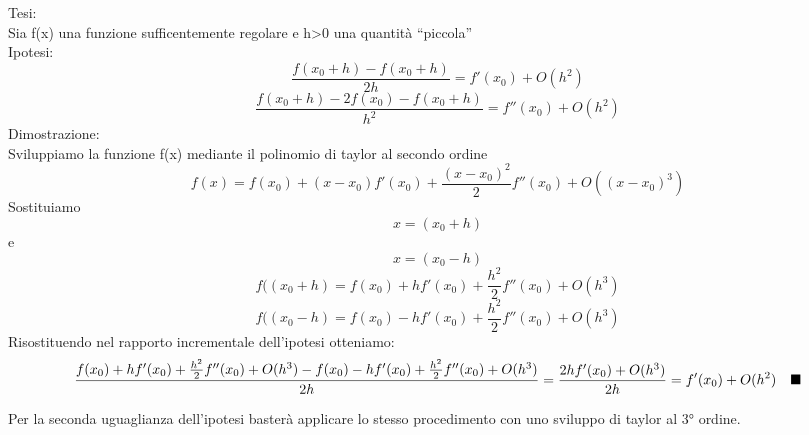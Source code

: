 Tesi:\\
Sia f(x) una funzione sufficentemente regolare e h>0 una quantità ``piccola''\\
Ipotesi:\\
\[
\frac{f(x_0 + h) - f(x_0 + h)}{2h} = f'(x_0) + O(h^2)
\]
\[
\frac{f(x_0 + h) -2f(x_0) - f(x_0 + h)}{h^2} = f''(x_0) + O(h^2)
\]
Dimostrazione:\\
Sviluppiamo la funzione f(x) mediante il polinomio di taylor al secondo ordine\\
\[
f(x) = f(x_0) + (x-x_0)f'(x_0)+\frac{(x-x_0)^2}{2}f''(x_0) + O((x-x_0)^3)
\]
Sostituiamo \[x=(x_0 +h)\] e  \[x=(x_0-h)\]
\[
f((x_0 +h) = f(x_0) + hf'(x_0)+\frac{h^2}{2}f''(x_0) + O(h^3)
\]
\[
f((x_0 -h) = f(x_0) - hf'(x_0)+\frac{h^2}{2}f''(x_0) + O(h^3)
\]
Risostituendo  nel rapporto incrementale dell'ipotesi otteniamo:
\[
\frac{ f(x_0) + hf'(x_0)+\frac{h^2}{2}f''(x_0) + O(h^3) - f(x_0) - hf'(x_0)+\frac{h^2}{2}f''(x_0) + O(h^3)}{2h} = \frac{2hf'(x_0) + O(h^3)}{2h} =f'(x_0) + O(h^2) \hspace{1em}\blacksquare
\]

Per la seconda uguaglianza dell'ipotesi basterà applicare lo stesso procedimento con uno sviluppo di taylor al 3° ordine.
